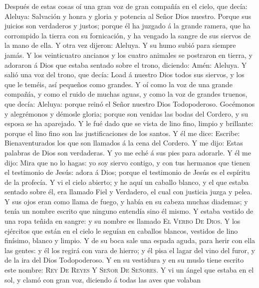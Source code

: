  Después de estas cosas oí una gran voz de gran compañía
en el cielo, que decía: Aleluya: Salvación y honra y gloria y potencia
al Señor Dios nuestro.  Porque sus juicios son verdaderos
y justos; porque él ha juzgado á la grande ramera, que ha corrompido la
tierra con su fornicación, y ha vengado la sangre de sus siervos de la
mano de ella.  Y otra vez dijeron: Aleluya. Y su humo
subió para siempre jamás.  Y los veinticuatro ancianos y
los cuatro animales se postraron en tierra, y adoraron á Dios que estaba
sentado sobre el trono, diciendo: Amén: Aleluya.  Y salió
una voz del trono, que decía: Load á nuestro Dios todos sus siervos, y
los que le teméis, así pequeños como grandes.  Y oí como
la voz de una grande compañía, y como el ruido de muchas aguas, y como
la voz de grandes truenos, que decía: Aleluya: porque reinó el Señor
nuestro Dios Todopoderoso.  Gocémonos y alegrémonos y
démosle gloria; porque son venidas las bodas del Cordero, y su esposa se
ha aparejado.  Y le fué dado que se vista de lino fino,
limpio y brillante: porque el lino fino son las justificaciones de los
santos.  Y él me dice: Escribe: Bienaventurados los que
son llamados á la cena del Cordero. Y me dijo: Estas palabras de Dios
son verdaderas.  Y yo me eché á sus pies para adorarle. Y
él me dijo: Mira que no lo hagas: yo soy siervo contigo, y con tus
hermanos que tienen el testimonio de Jesús: adora á Dios; porque el
testimonio de Jesús es el espíritu de la profecía.  Y vi
el cielo abierto; y he aquí un caballo blanco, y el que estaba sentado
sobre él, era llamado Fiel y Verdadero, el cual con justicia juzga y
pelea.  Y sus ojos eran como llama de fuego, y había en
su cabeza muchas diademas; y tenía un nombre escrito que ninguno
entendía sino él mismo.  Y estaba vestido de una ropa
teñida en sangre: y su nombre es llamado \textsc{El} \textsc{Verbo}
\textsc{De} \textsc{Dios}.  Y los ejércitos que están en
el cielo le seguían en caballos blancos, vestidos de lino finísimo,
blanco y limpio.  Y de su boca sale una espada aguda,
para herir con ella las gentes: y él los regirá con vara de hierro; y él
pisa el lagar del vino del furor, y de la ira del Dios Todopoderoso.
 Y en su vestidura y en su muslo tiene escrito este
nombre: \textsc{Rey} \textsc{De} \textsc{Reyes} Y \textsc{Señor}
\textsc{De} \textsc{Señores}.  Y vi un ángel que estaba
en el sol, y clamó con gran voz, diciendo á todas las aves que volaban
